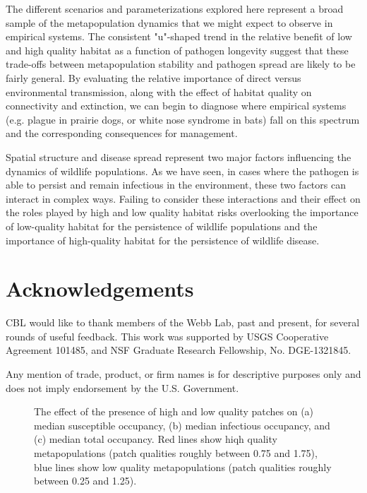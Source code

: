 \documentclass{article}
\begin{document}
The different scenarios and parameterizations explored here represent a broad sample of the metapopulation dynamics that we might expect to observe in empirical systems.  The consistent "u"-shaped trend in the relative benefit of low and high quality habitat as a function of pathogen longevity suggest that these trade-offs between metapopulation stability and pathogen spread are likely to be fairly general.  By evaluating the relative importance of direct versus environmental transmission, along with the effect of habitat quality on connectivity and extinction, we can begin to diagnose where empirical systems (e.g. plague in prairie dogs, or white nose syndrome in bats) fall on this spectrum and the corresponding consequences for management.

Spatial structure and disease spread represent two major factors influencing the dynamics of wildlife populations.  As we have seen, in cases where the pathogen is able to persist and remain infectious in the environment, these two factors can interact in complex ways.  Failing to consider these interactions and their effect on the roles played by high and low quality habitat risks overlooking the importance of low-quality habitat for the persistence of wildlife populations and the importance of high-quality habitat for the persistence of wildlife disease.

\section{Acknowledgements}

CBL would like to thank members of the Webb Lab, past and present, for several rounds of useful feedback.  This work was supported by USGS Cooperative Agreement 101485, and NSF Graduate Research Fellowship, No. DGE-1321845.

Any mention of trade, product, or firm names is for descriptive purposes only and does not imply endorsement by the U.S. Government.

\clearpage

     

\clearpage

\begin{figure}
\caption{The effect of the presence of high and low quality patches on (a) median susceptible occupancy, (b) median infectious occupancy, and (c) median total occupancy.  Red lines show hiqh quality metapopulations (patch qualities roughly between 0.75 and 1.75), blue lines show low quality metapopulations (patch qualities roughly between 0.25 and 1.25).}
\label{sens}
\end{figure}
\end{document}
